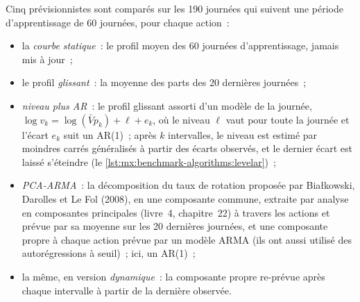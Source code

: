 \begin{omfigure}

\label{fig:mx:benchmark-algorithms:profile}
\end{omfigure}

Cinq prévisionnistes sont comparés sur les 190 journées qui suivent une période d'apprentissage de 60 journées, pour chaque action~:
\begin{itemize}
\item la \emph{courbe statique}~: le profil moyen des 60 journées d'apprentissage, jamais mis à jour~;
\item le profil \emph{glissant}~: la moyenne des parts des 20 dernières journées~;
\item \emph{niveau plus AR}~: le profil glissant assorti d'un modèle de la journée, $\log v_k=\log(\bar V p_k)+\ell+e_k$, où le niveau $\ell$ vaut pour toute la journée et
l'écart $e_k$ suit un AR(1)~; après $k$ intervalles, le niveau est estimé par moindres carrés généralisés à partir des écarts observés, et le dernier écart est
laissé s'éteindre (le \cref{lst:mx:benchmark-algorithms:levelar})~;
\item \emph{PCA-ARMA}~: la décomposition du taux de rotation proposée par Białkowski, Darolles et Le Fol (2008), en une composante commune, extraite par analyse en
composantes principales (livre~4, chapitre~22) à travers les actions et prévue par sa moyenne sur les 20 dernières journées, et une composante propre à chaque action prévue
par un modèle ARMA (ils ont aussi utilisé des autorégressions à seuil)~; ici, un AR(1)~;
\item la même, en version \emph{dynamique}~: la composante propre re-prévue après chaque intervalle à partir de la dernière observée.
\end{itemize}

